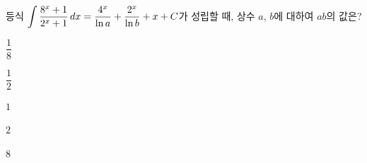 등식 $\displaystyle\int \dfrac{8^x+1}{2^x+1}\mkern3mu dx=\dfrac{4^x}{\ln a}+\dfrac{2^x}{\ln b}+x+C$가 성립할 때, 상수 $a$, $b$에 대하여 $ab$의 값은? 
\begin{choices32}{\rule[-3ex]{0pt}{8ex}$\dfrac{1}{8}$}{\rule[-3ex]{0pt}{8ex}$\dfrac{1}{2}$}{\rule[-3ex]{0pt}{8ex}$1$}{\rule[-3ex]{0pt}{8ex}$2$}{\rule[-3ex]{0pt}{8ex}$8$}\end{choices32}
